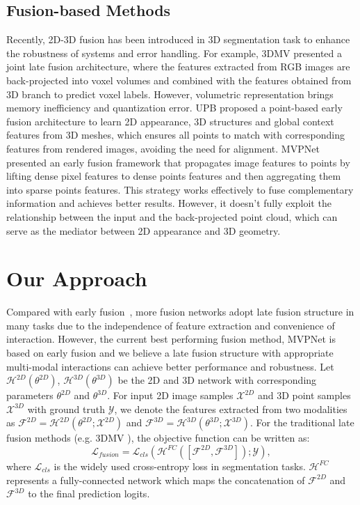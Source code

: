 \documentclass[letterpaper, 10 pt, conference]{ieeeconf}
\begin{document}
\subsection{Fusion-based Methods}

Recently, 2D-3D fusion has been introduced in 3D segmentation task to enhance the robustness of systems and error handling. For example, 3DMV \cite{dai20183dmv} presented a joint late fusion architecture, where the features extracted from RGB images are back-projected into voxel volumes and combined with the features obtained from 3D branch to predict voxel labels. However, volumetric representation brings memory inefficiency and quantization error. UPB \cite{chiang2019unified} proposed a point-based early fusion architecture to learn 2D appearance, 3D structures and global context features from 3D meshes, which ensures all points to match with corresponding features from rendered images, avoiding the need for alignment. MVPNet \cite{jaritz2019multi} presented an early fusion framework that propagates image features to points by lifting dense pixel features to dense points features and then aggregating them into sparse points features. This strategy works effectively to fuse complementary information and achieves better results. However, it doesn't fully exploit the relationship between the input and the back-projected point cloud, which can serve as the mediator between 2D appearance and 3D geometry. 



\section{Our Approach}




Compared with early fusion~\cite{zhang2020deep}, more fusion networks adopt late fusion structure in many tasks \cite{Liu_2013_CVPR,zhang2019late,8451915} due to the independence of feature extraction and convenience of interaction. However, the current best performing fusion method, MVPNet \cite{jaritz2019multi} is based on early fusion and we believe a late fusion structure with appropriate multi-modal interactions can achieve better performance and robustness.
Let $\mathcal{H}^{2D}(\theta^{2D})$, $\mathcal{H}^{3D}(\theta^{3D})$ be the 2D and 3D network with corresponding parameters $\theta^{2D}$ and $\theta^{3D}$. For input 2D image samples $\mathcal{X}^{2D}$ and 3D point samples $\mathcal{X}^{3D}$ with ground truth $\mathcal{Y}$, we denote the features extracted from two modalities as $\mathcal{F}^{2D} = \mathcal{H}^{2D}(\theta^{2D};\mathcal{X}^{2D})$ and $\mathcal{F}^{3D} = \mathcal{H}^{3D}(\theta^{3D};\mathcal{X}^{3D})$. For the traditional late fusion methods (e.g. 3DMV \cite{dai20183dmv}), the objective function can be written as:
\begin{equation}
\mathcal{L}_{fusion} = \mathcal{L}_{cls}(\mathcal{H}^{FC}([\mathcal{F}^{2D},\mathcal{F}^{3D}]);\mathcal{Y}),
\end{equation}
where $\mathcal{L}_{cls}$ is the widely used cross-entropy loss in segmentation tasks. $\mathcal{H}^{FC}$ represents a fully-connected network which maps the concatenation of $\mathcal{F}^{2D}$ and $\mathcal{F}^{3D}$ to the final prediction logits.
\end{document}
